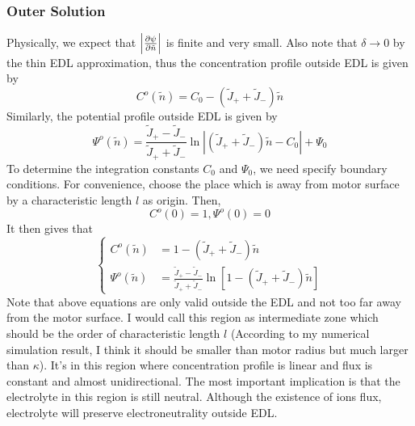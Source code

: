 \documentclass[fontsize=11pt, %
                             paper=a4, %
                             twoside, %
                             captions=tableheading,
                             index=totoc,
                             hyperref]{labbook}
\begin{document}
\begin{addmargin}[4cm]{0cm}
\subsubsection{Outer Solution}
Physically, we expect that $\left| \frac{\partial \psi}{\partial \tilde n} \right|$ is finite and very small. Also note that $\delta \to 0$ by the thin EDL approximation, thus the concentration profile outside EDL is given by
\begin{equation}
C^o(\tilde n)=C_0-(\tilde J_+ + \tilde J_-)\tilde n
\end{equation}
Similarly, the potential profile outside EDL is given by
\begin{equation}
\Psi^o(\tilde n)=\frac{\tilde J_+ - \tilde J_-}{\tilde J_+ + \tilde J_-} \ln \left| (\tilde J_+ + \tilde J_-)\tilde n -C_0\right| + \Psi_0
\end{equation}
To determine the integration constants $C_0$ and $\Psi_0$, we need specify boundary conditions. For convenience, choose the place which is away from motor surface by a characteristic length $l$ as origin. Then,
\begin{equation}
C^o(0)=1, \Psi^o(0)=0
\end{equation}
It then gives that
\begin{equation}
\left\{
\begin{aligned}
C^o(\tilde n)&=1-(\tilde J_+ + \tilde J_-)\tilde n\\
\Psi^o(\tilde n)&=\frac{\tilde J_+ - \tilde J_-}{\tilde J_+ + \tilde J_-} \ln \left[1-(\tilde J_+ + \tilde J_-)\tilde n\right]
\end{aligned}
\right.
\end{equation}
Note that above equations are only valid outside the EDL and not too far away from the motor surface. I would call this region as intermediate zone which should be the order of characteristic length $l$ (According to my numerical simulation result, I think it should be smaller than motor radius but much larger than $\kappa$). It's in this region where concentration profile is linear and flux is constant and almost unidirectional. The most important implication is that the electrolyte in this region is still neutral. Although the existence of ions flux, electrolyte will preserve electroneutrality outside EDL.

\end{addmargin}
\end{document}
